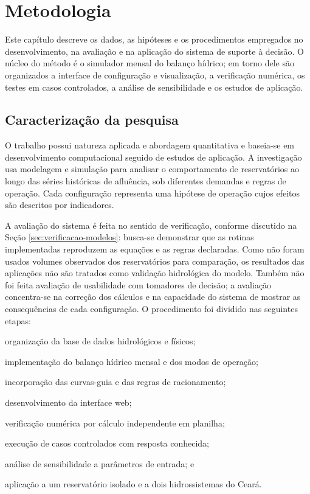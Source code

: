 \chapter{Metodologia}
\label{cap:metodologia}

Este capítulo descreve os dados, as hipóteses e os procedimentos empregados no desenvolvimento, na avaliação e na aplicação do sistema de suporte à decisão. O núcleo do método é o simulador mensal do balanço hídrico; em torno dele são organizados a interface de configuração e visualização, a verificação numérica, os testes em casos controlados, a análise de sensibilidade e os estudos de aplicação.

\section{Caracterização da pesquisa}
\label{sec:caracterizacao-pesquisa}

O trabalho possui natureza aplicada e abordagem quantitativa e baseia-se em desenvolvimento computacional seguido de estudos de aplicação. A investigação usa modelagem e simulação para analisar o comportamento de reservatórios ao longo das séries históricas de afluência, sob diferentes demandas e regras de operação. Cada configuração representa uma hipótese de operação cujos efeitos são descritos por indicadores.

A avaliação do sistema é feita no sentido de verificação, conforme discutido na Seção \ref{sec:verificacao-modelos}: busca-se demonstrar que as rotinas implementadas reproduzem as equações e as regras declaradas. Como não foram usados volumes observados dos reservatórios para comparação, os resultados das aplicações não são tratados como validação hidrológica do modelo. Também não foi feita avaliação de usabilidade com tomadores de decisão; a avaliação concentra-se na correção dos cálculos e na capacidade do sistema de mostrar as consequências de cada configuração. O procedimento foi dividido nas seguintes etapas:

\begin{alineas}
    \item organização da base de dados hidrológicos e físicos;
    \item implementação do balanço hídrico mensal e dos modos de operação;
    \item incorporação das curvas-guia e das regras de racionamento;
    \item desenvolvimento da interface web;
    \item verificação numérica por cálculo independente em planilha;
    \item execução de casos controlados com resposta conhecida;
    \item análise de sensibilidade a parâmetros de entrada; e
    \item aplicação a um reservatório isolado e a dois hidrossistemas do Ceará.
\end{alineas}

